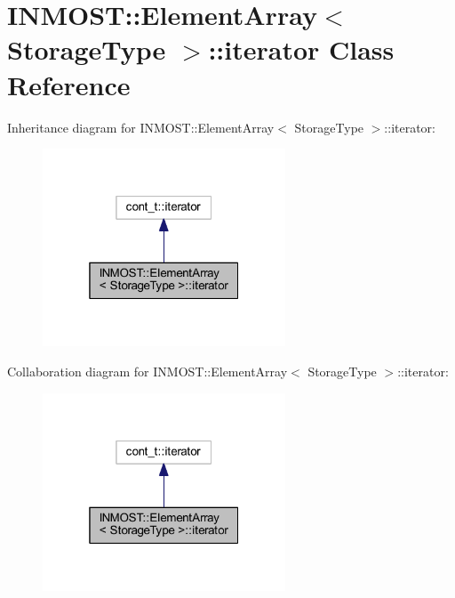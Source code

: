 \hypertarget{classINMOST_1_1ElementArray_1_1iterator}{\section{I\-N\-M\-O\-S\-T\-:\-:Element\-Array$<$ Storage\-Type $>$\-:\-:iterator Class Reference}
\label{classINMOST_1_1ElementArray_1_1iterator}
}


Inheritance diagram for I\-N\-M\-O\-S\-T\-:\-:Element\-Array$<$ Storage\-Type $>$\-:\-:iterator\-:
\nopagebreak
\begin{figure}[H]
\begin{center}
\leavevmode
\includegraphics[width=205pt]{classINMOST_1_1ElementArray_1_1iterator__inherit__graph}
\end{center}
\end{figure}


Collaboration diagram for I\-N\-M\-O\-S\-T\-:\-:Element\-Array$<$ Storage\-Type $>$\-:\-:iterator\-:
\nopagebreak
\begin{figure}[H]
\begin{center}
\leavevmode
\includegraphics[width=205pt]{classINMOST_1_1ElementArray_1_1iterator__coll__graph}
\end{center}
\end{figure}
